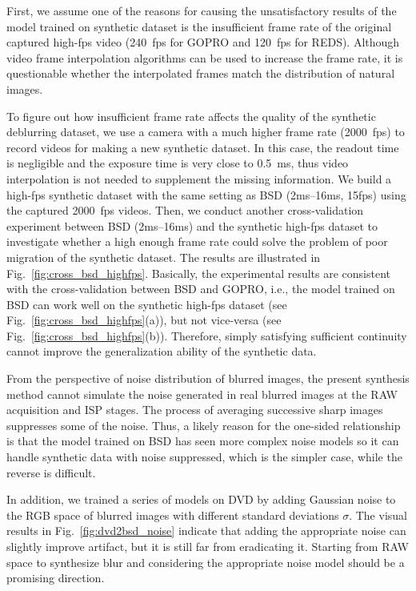 \documentclass[twocolumn]{svjour3}          \smartqed  \usepackage{graphicx}
\begin{document}
First, we assume one of the reasons for causing the unsatisfactory results of the model trained on synthetic dataset is the insufficient frame rate of the original captured high-fps video (\SI{240}{fps} for GOPRO and \SI{120}{fps} for REDS). Although video frame interpolation algorithms can be used to increase the frame rate, it is questionable whether the interpolated frames match the distribution of natural images.

To figure out how insufficient frame rate affects the quality of the synthetic deblurring dataset, we use a camera with a much higher frame rate (\SI{2000}{fps}) to record videos for making a new synthetic dataset. In this case, the readout time is negligible and the exposure time is very close to \SI{0.5}{\milli\second}, thus video interpolation is not needed to supplement the missing information. We build a high-fps synthetic dataset with the same setting as BSD (2ms--16ms, 15fps) using the captured \SI{2000}{fps} videos. Then, we conduct another cross-validation experiment between BSD (2ms--16ms) and the synthetic high-fps dataset to investigate whether a high enough frame rate could solve the problem of poor migration of the synthetic dataset. The results are illustrated in Fig.~\ref{fig:cross_bsd_highfps}. Basically, the experimental results are consistent with the cross-validation between BSD and GOPRO, i.e., the model trained on BSD can work well on the synthetic high-fps dataset (see Fig.~\ref{fig:cross_bsd_highfps}(a)), but not vice-versa (see Fig.~\ref{fig:cross_bsd_highfps}(b)). Therefore, simply satisfying sufficient continuity cannot improve the generalization ability of the synthetic data.

From the perspective of noise distribution of blurred images, the present synthesis method cannot simulate the noise generated in real blurred images at the RAW acquisition and ISP stages. The process of averaging successive sharp images suppresses some of the noise. Thus, a likely reason for the one-sided relationship is that the model trained on BSD has seen more complex noise models so it can handle synthetic data with noise suppressed, which is the simpler case, while the reverse is difficult.

In addition, we trained a series of models on DVD by adding Gaussian noise to the RGB space of blurred images with different standard deviations $\sigma$. The visual results in Fig.~\ref{fig:dvd2bsd_noise} indicate that adding the appropriate noise can slightly improve artifact, but it is still far from eradicating it. Starting from RAW space to synthesize blur and considering the appropriate noise model should be a promising direction.
\end{document}
